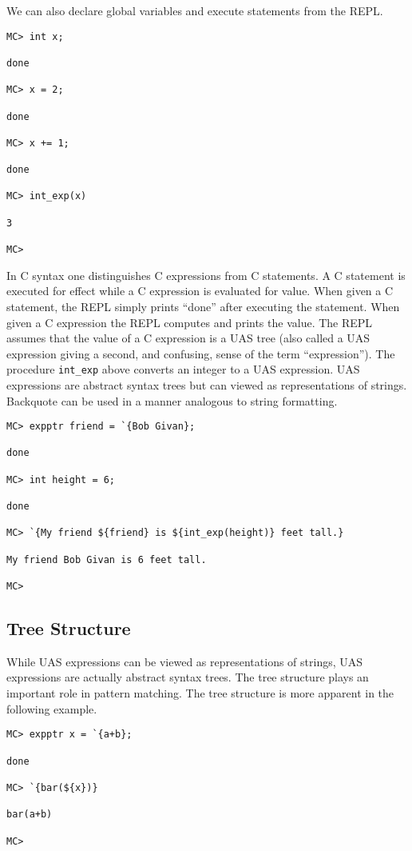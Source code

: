 \documentclass{article}
\begin{document}
We can also declare global variables and execute statements from the REPL.

\begin{verbatim}
MC> int x;

done

MC> x = 2;

done

MC> x += 1;

done

MC> int_exp(x)

3

MC>
\end{verbatim}

In C syntax one distinguishes C expressions from C statements.  A C statement is executed for effect while a C expression is evaluated for value. When given a C statement, the REPL simply prints ``done'' after executing the statement.  When given a C expression
the REPL computes and prints the value.  The REPL assumes that the value of a C expression is a UAS tree (also called a UAS expression giving a second, and confusing, sense of the term ``expression''). The procedure {\tt int\_exp} above converts an integer to a UAS expression.
UAS expressions are abstract syntax trees but can viewed as representations of strings.
Backquote can be used in a manner analogous to string formatting.

\begin{verbatim}
MC> expptr friend = `{Bob Givan};

done

MC> int height = 6;

done

MC> `{My friend ${friend} is ${int_exp(height)} feet tall.}

My friend Bob Givan is 6 feet tall.

MC> 
\end{verbatim}

\subsection{Tree Structure}

While UAS expressions can be viewed as representations of strings, UAS expressions are actually abstract syntax trees. The tree structure
plays an important role in pattern matching. The tree structure is more apparent in the following example.

\begin{verbatim}
MC> expptr x = `{a+b};

done

MC> `{bar(${x})}

bar(a+b)

MC>
\end{verbatim}
\end{document}
